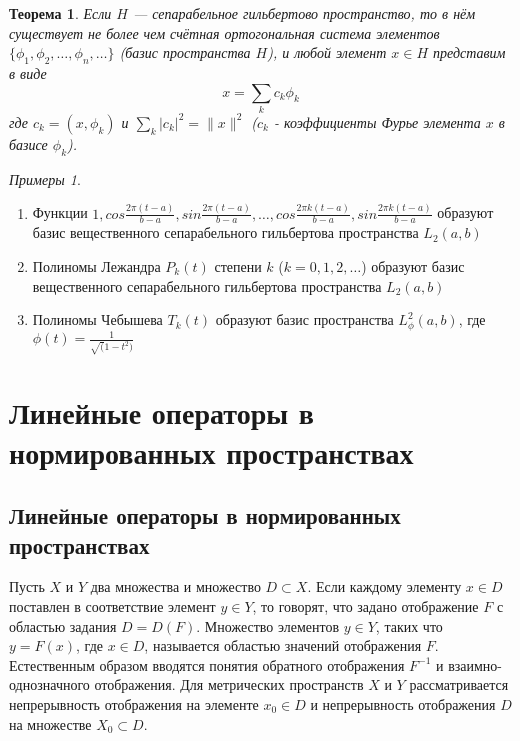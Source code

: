 \documentclass[12pt,a4paper,titlepage, oneside]{book}
\theoremstyle{definition}
\theoremstyle{plain}
\newtheorem*{theorem}{Теорема}
\theoremstyle{remark}
\theoremstyle{remark}
\theoremstyle{remark}
\newtheorem*{examples}{Примеры}
\theoremstyle{remark}
\theoremstyle{plain}
\theoremstyle{plain}
\begin{document}
\begin{theorem}
	Если $H$ --- сепарабельное гильбертово пространство, то в нём существует не более чем счётная ортогональная система элементов $\lbrace \phi_1, \phi_2, \ldots, \phi_n, \ldots \rbrace$ (базис пространства $H$), и любой элемент $x \in H$ представим в виде 
	$$x = \displaystyle\sum_{k} c_k \phi_k$$
	где $c_k = (x, \phi_k)$ и $\displaystyle\sum_{k} \lvert c_k \rvert^2 = \parallel x \parallel^2$ ($c_k$ - коэффициенты Фурье элемента $x$ в базисе $\phi_k$).
\end{theorem}

\begin{examples}
\leavevmode
\begin{enumerate}
	\item Функции $1, cos \frac{2 \pi (t - a)}{b - a}, sin \frac{2 \pi (t - a)}{b - a}, \ldots, cos \frac{2 \pi k (t - a)}{b - a}, sin \frac{2 \pi k (t - a)}{b - a}$ образуют базис вещественного сепарабельного гильбертова пространства $L_2(a, b)$
	
	\item Полиномы Лежандра $P_k(t)$ степени $k$ ($k = 0, 1, 2, \ldots$) образуют базис вещественного сепарабельного гильбертова пространства $L_2(a, b)$
	
	\item Полиномы Чебышева $T_k(t)$ образуют базис пространства $L_{\phi}^2 (a, b)$, где $\phi(t) = \frac{1}{\sqrt(1 - t^2)}$
\end{enumerate}
\end{examples}

\chapter{Линейные операторы в нормированных пространствах}

\section{Линейные операторы в нормированных пространствах}
Пусть $X$ и $Y$ два множества и множество $D \subset X$. Если каждому элементу $x \in D$ поставлен в соответствие элемент $y \in Y$, то говорят, что задано отображение $F$ с областью задания $D=D(F)$. Множество элементов $y \in Y$, таких что $y=F(x)$, где $x \in D$, называется областью значений отображения $F$. Естественным образом вводятся понятия обратного отображения ${F}^{-1}$ и взаимно-однозначного отображения. Для метрических пространств $X$ и $Y$ рассматривается непрерывность отображения на элементе $x_0 \in D$ и непрерывность отображения $D$ на множестве $X_0 \subset D$.
\end{document}

